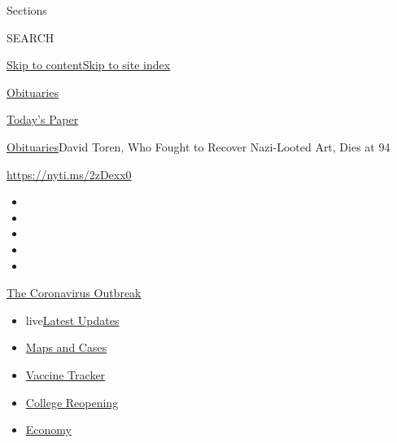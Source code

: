 Sections

SEARCH

\protect\hyperlink{site-content}{Skip to
content}\protect\hyperlink{site-index}{Skip to site index}

\href{https://www.nytimes3xbfgragh.onion/section/obituaries}{Obituaries}

\href{https://myaccount.nytimes3xbfgragh.onion/auth/login?response_type=cookie\&client_id=vi}{}

\href{https://www.nytimes3xbfgragh.onion/section/todayspaper}{Today's
Paper}

\href{/section/obituaries}{Obituaries}\textbar{}David Toren, Who Fought
to Recover Nazi-Looted Art, Dies at 94

\url{https://nyti.ms/2zDexx0}

\begin{itemize}
\item
\item
\item
\item
\item
\end{itemize}

\href{https://www.nytimes3xbfgragh.onion/news-event/coronavirus?action=click\&pgtype=Article\&state=default\&region=TOP_BANNER\&context=storylines_menu}{The
Coronavirus Outbreak}

\begin{itemize}
\tightlist
\item
  live\href{https://www.nytimes3xbfgragh.onion/2020/08/04/world/coronavirus-covid-19.html?action=click\&pgtype=Article\&state=default\&region=TOP_BANNER\&context=storylines_menu}{Latest
  Updates}
\item
  \href{https://www.nytimes3xbfgragh.onion/interactive/2020/us/coronavirus-us-cases.html?action=click\&pgtype=Article\&state=default\&region=TOP_BANNER\&context=storylines_menu}{Maps
  and Cases}
\item
  \href{https://www.nytimes3xbfgragh.onion/interactive/2020/science/coronavirus-vaccine-tracker.html?action=click\&pgtype=Article\&state=default\&region=TOP_BANNER\&context=storylines_menu}{Vaccine
  Tracker}
\item
  \href{https://www.nytimes3xbfgragh.onion/2020/08/02/us/covid-college-reopening.html?action=click\&pgtype=Article\&state=default\&region=TOP_BANNER\&context=storylines_menu}{College
  Reopening}
\item
  \href{https://www.nytimes3xbfgragh.onion/live/2020/08/03/business/stock-market-today-coronavirus?action=click\&pgtype=Article\&state=default\&region=TOP_BANNER\&context=storylines_menu}{Economy}
\end{itemize}

